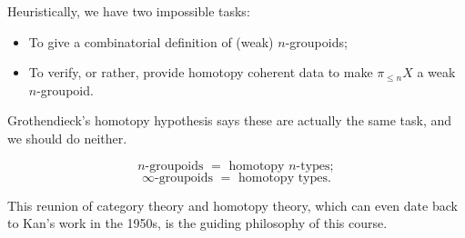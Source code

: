 Heuristically, we have two impossible tasks:
\begin{itemize}
	\item 
		To give a combinatorial definition of (weak) $n$-groupoids;
	\item
		To verify, or rather, provide homotopy coherent data to make $\pi_{\le n}X$ a weak $n$-groupoid.
\end{itemize}
Grothendieck's homotopy hypothesis says these are actually the same task, and we should do neither.

\begin{slog}
	\[
		n\mbox{-groupoids } = \mbox{ homotopy } n \mbox{-types};
	\]
	\[
		\infty\mbox{-groupoids } = \mbox{ homotopy types}.
	\]
	
\end{slog}

\ssec{}

This reunion of category theory and homotopy theory, which can even date back to Kan's work in the 1950s, is the guiding philosophy of this course.




{}







 


